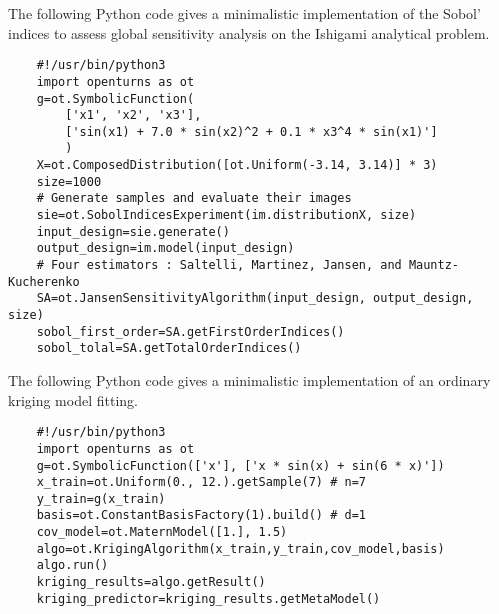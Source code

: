 \begin{otexample}
    The following Python code gives a minimalistic \ot implementation of the Sobol' indices to assess global sensitivity analysis on the Ishigami analytical problem. 
    \lstset{style=mystyle, language=python}
%
\begin{lstlisting}
    #!/usr/bin/python3
    import openturns as ot
    g=ot.SymbolicFunction(
        ['x1', 'x2', 'x3'], 
        ['sin(x1) + 7.0 * sin(x2)^2 + 0.1 * x3^4 * sin(x1)']
        )
    X=ot.ComposedDistribution([ot.Uniform(-3.14, 3.14)] * 3)
    size=1000
    # Generate samples and evaluate their images
    sie=ot.SobolIndicesExperiment(im.distributionX, size)
    input_design=sie.generate()
    output_design=im.model(input_design)
    # Four estimators : Saltelli, Martinez, Jansen, and Mauntz-Kucherenko
    SA=ot.JansenSensitivityAlgorithm(input_design, output_design, size)
    sobol_first_order=SA.getFirstOrderIndices()
    sobol_tolal=SA.getTotalOrderIndices()
\end{lstlisting}
%
\end{otexample}



\begin{otexample}
    The following Python code gives a minimalistic \ot implementation of an ordinary kriging model fitting. 
    \lstset{style=mystyle, language=python}
%
\begin{lstlisting}
    #!/usr/bin/python3
    import openturns as ot
    g=ot.SymbolicFunction(['x'], ['x * sin(x) + sin(6 * x)'])
    x_train=ot.Uniform(0., 12.).getSample(7) # n=7
    y_train=g(x_train)
    basis=ot.ConstantBasisFactory(1).build() # d=1
    cov_model=ot.MaternModel([1.], 1.5)
    algo=ot.KrigingAlgorithm(x_train,y_train,cov_model,basis)
    algo.run()
    kriging_results=algo.getResult()
    kriging_predictor=kriging_results.getMetaModel()
\end{lstlisting}
%
\end{otexample}
